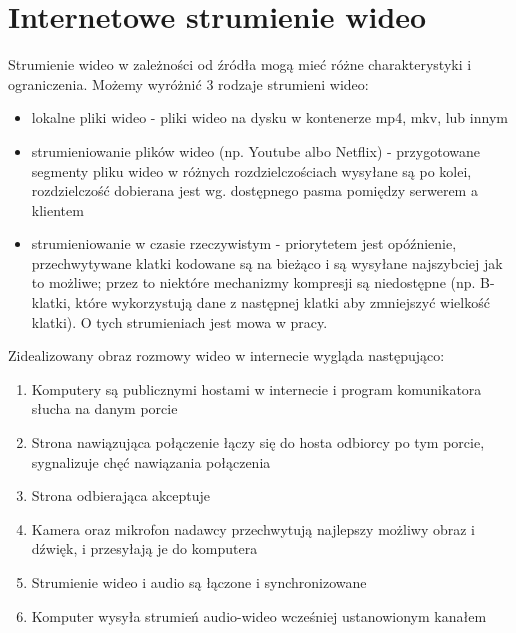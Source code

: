 


\section{Internetowe strumienie wideo}

Strumienie wideo w zależności od źródła mogą mieć różne charakterystyki i ograniczenia.
Możemy wyróżnić 3 rodzaje strumieni wideo:

\begin{itemize}
    \item lokalne pliki wideo - pliki wideo na dysku w kontenerze mp4, mkv, lub innym
    \item strumieniowanie plików wideo (np. Youtube albo Netflix) - przygotowane segmenty pliku
          wideo w różnych rozdzielczościach wysyłane są po kolei, rozdzielczość dobierana jest wg.
          dostępnego pasma pomiędzy serwerem a klientem
    \item strumieniowanie w czasie rzeczywistym - priorytetem jest opóźnienie, przechwytywane klatki
          kodowane są na bieżąco i są wysyłane najszybciej jak to możliwe; przez to niektóre
          mechanizmy kompresji są niedostępne (np. B-klatki, które wykorzystują dane z następnej
          klatki aby zmniejszyć wielkość klatki). O tych strumieniach jest mowa w pracy.
\end{itemize}

Zidealizowany obraz rozmowy wideo w internecie wygląda następująco:

\begin{enumerate}
    \item Komputery są publicznymi hostami w internecie i program komunikatora słucha na danym porcie
    \item Strona nawiązująca połączenie łączy się do hosta odbiorcy po tym porcie, sygnalizuje chęć
          nawiązania połączenia
    \item Strona odbierająca akceptuje
    \item Kamera oraz mikrofon nadawcy przechwytują najlepszy możliwy obraz i dźwięk, i przesyłają
          je do komputera
    \item Strumienie wideo i audio są łączone i synchronizowane
    \item Komputer wysyła strumień audio-wideo wcześniej ustanowionym kanałem
\end{enumerate}

